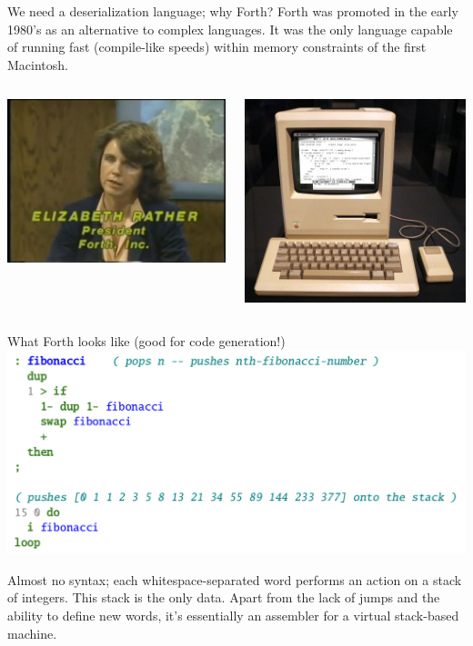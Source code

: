 \documentclass[aspectratio=169]{beamer}
\begin{document}
\begin{frame}{We need a deserialization language; why Forth?}
\vspace{0.5 cm}
Forth was promoted in the early 1980's as an alternative to complex languages. It was the only language capable of running fast (compile-like speeds) within memory constraints of the first Macintosh.

\vspace{0.5 cm}
\begin{columns}
\centering
\includegraphics[height=5 cm]{PLOTS/elizabeth-rather-the-computer-chronicles.png}

\centering
\includegraphics[height=5 cm]{PLOTS/macintosh-forth-code.jpg}
\end{columns}
\end{frame}

\begin{frame}{What Forth looks like (good for code generation!)}
\vspace{0.25 cm}
\includegraphics[width=0.9\linewidth]{PLOTS/forth-example.png}

\vspace{0.5 cm}
Almost no syntax; each whitespace-separated word performs an action on a stack of integers. This stack is the only data. Apart from the lack of jumps and the ability to define new words, it's essentially an assembler for a virtual stack-based machine.
\end{frame}
\end{document}
